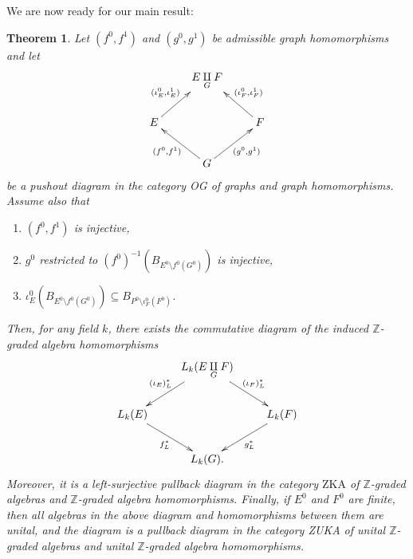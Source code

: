 \documentclass[12pt,times,a4paper]{amsart}
\newtheorem{theorem}{Theorem}[section]
\numberwithin{equation}{section}
\numberwithin{equation}{section}
\begin{document}
We are now ready for our main result:
\begin{theorem}\label{main}
Let $(f^0,f^1)$ and $(g^0,g^1)$ be admissible graph homomorphisms and let
\begin{equation}\label{pushdiag}
\xymatrix{
&
E\underset{G}{\amalg}F
&\\
E
\ar[ur]^{(\iota_E^0,\iota_E^1)}& & 
F
\ar[ul]_{(\iota_F^0,\iota_F^1)}\\
&
G
\ar[ur]_{(g^0,g^1)}\ar[ul]^{(f^0,f^1)}&
}
\end{equation}
be a pushout diagram in the  category {\rm OG} of graphs and graph homomorphisms. Assume also that
\begin{enumerate}
\item[{\rm (P1)}] 
$(f^0,f^1)$ is injective,
\item[{\rm (P2)}]
 $g^0$ restricted to $(f^0)^{-1}(B_{E^0\setminus f^0(G^0)})$ is injective,
\item[{\rm (P3)}]
$\iota_E^0(B_{E^0\setminus f^0(G^0)})\subseteq B_{P^0\setminus\iota_F^0(F^0)}$.
\end{enumerate}
Then, for any field $k$, there exists the commutative diagram of the induced $\mathbb{Z}$-graded algebra 
\mbox{homo}\-mor\-phisms
\begin{equation}\label{pulldiag}
\xymatrix{
&
L_k(E\underset{G}{\amalg}F)
\ar[dl]_{(\iota_E)^*_L} \ar[dr]^{(\iota_F)^*_L}&\\
L_k(E)
\ar[dr]_{f^*_L}& & 
L_k(F)
\ar[dl]^{g^*_L}\\
& L_k(G) .&
}
\end{equation}
Moreover, it is a left-surjective pullback diagram in the category $\mathrm{ZKA}$ of $\mathbb{Z}$-graded
algebras and $\mathbb{Z}$-graded algebra homomorphisms.
Finally, if $E^0$ and $F^0$ are finite, then all algebras in the above 
diagram and homomorphisms between them are unital, and the diagram is a pullback diagram in the category {\rm ZUKA} 
of unital $\mathbb{Z}$-graded
algebras and unital $\mathbb{Z}$-graded algebra homomorphisms.
\end{theorem}
\end{document}
